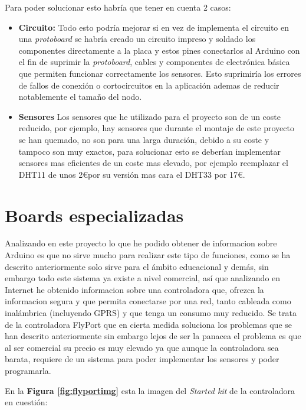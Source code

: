 Para poder solucionar esto habría que tener en cuenta 2 casos:

\begin{itemize}
	\item \textbf{Circuito:} Todo esto podría mejorar si en vez de implementa el circuito en una \textit{protoboard} se habría creado un circuito impreso y soldado los componentes directamente a la placa y estos pines conectarlos al Arduino con el fin de suprimir la \textit{protoboard}, cables y componentes de electrónica básica que permiten funcionar correctamente los sensores. Esto suprimiría los errores de fallos de conexión o cortocircuitos en la aplicación ademas de reducir notablemente el tamaño del nodo.   
	
	\item \textbf{Sensores} Los sensores que he utilizado para el proyecto son de un coste reducido, por ejemplo, hay sensores que durante el montaje de este proyecto se han quemado, no son para una larga duración, debido a su coste y tampoco son muy exactos, para solucionar esto se deberían implementar sensores mas eficientes de un coste mas elevado, por ejemplo reemplazar el DHT11 de unos 2\euro por su versión mas cara el DHT33 por 17\euro.

\end{itemize}

\section{Boards especializadas}

\setlength{\parindent}{5ex}Analizando en este proyecto lo que he podido obtener de informacion sobre Arduino es que no sirve mucho para realizar este tipo de funciones, como se ha descrito anteriormente solo sirve para el ámbito educacional y demás, sin embargo todo este sistema ya existe a nivel comercial, así que analizando en Internet he obtenido informacion sobre una controladora que, ofrezca la informacion segura y que permita conectarse por una red, tanto cableada como inalámbrica (incluyendo GPRS) y que tenga un consumo muy reducido.
\setlength{\parindent}{0ex}
Se trata de la controladora FlyPort que en cierta medida soluciona los problemas que se han descrito anteriormente sin embargo lejos de ser la panacea el problema es que al ser comercial su precio es muy elevado ya que aunque la controladora sea barata, requiere de un sistema para poder implementar los sensores y poder programarla.

En la \textbf{Figura \ref{fig:flyportimg}} esta la imagen del \textit{Started kit} de la controladora en cuestión: 

